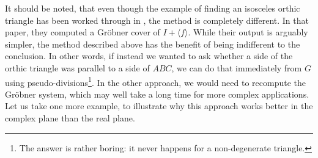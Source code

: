 It should be noted, that even though the example of finding an isosceles orthic triangle has been worked through in \cite{MONTES20101391}, the method is completely different. In that paper, they computed a Gröbner cover of $I + \langle f \rangle$. While their output is arguably simpler, the method described above has the benefit of being indifferent to the conclusion. In other words, if instead we wanted to ask whether a side of the orthic triangle was parallel to a side of $ABC$, we can do that immediately from $G$ using pseudo-divisions\footnote{The answer is rather boring: it never happens for a non-degenerate triangle.}. In the other approach, we would need to recompute the Gröbner system, which may well take a long time for more complex applications. Let us take one more example, to illustrate why this approach works better in the complex plane than the real plane.

